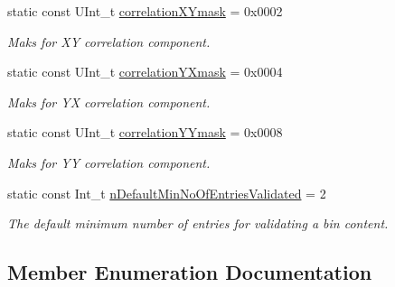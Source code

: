 \begin{DoxyCompactItemize}
\mbox{\label{classQn_1_1CorrectionHistogramBase_ae18a88f4419ad1ec1124e27b5527d685}} 
static const U\+Int\+\_\+t \mbox{\hyperlink{classQn_1_1CorrectionHistogramBase_ae18a88f4419ad1ec1124e27b5527d685}{correlation\+X\+Ymask}} = 0x0002
\begin{DoxyCompactList}\small\item\em Maks for XY correlation component. \end{DoxyCompactList}\item 
\mbox{\label{classQn_1_1CorrectionHistogramBase_ac248a0d6cc3d5fa4373962066ebaa74d}} 
static const U\+Int\+\_\+t \mbox{\hyperlink{classQn_1_1CorrectionHistogramBase_ac248a0d6cc3d5fa4373962066ebaa74d}{correlation\+Y\+Xmask}} = 0x0004
\begin{DoxyCompactList}\small\item\em Maks for YX correlation component. \end{DoxyCompactList}\item 
\mbox{\label{classQn_1_1CorrectionHistogramBase_a2169ee36c344c6e39388539b44fda4fc}} 
static const U\+Int\+\_\+t \mbox{\hyperlink{classQn_1_1CorrectionHistogramBase_a2169ee36c344c6e39388539b44fda4fc}{correlation\+Y\+Ymask}} = 0x0008
\begin{DoxyCompactList}\small\item\em Maks for YY correlation component. \end{DoxyCompactList}\item 
\mbox{\label{classQn_1_1CorrectionHistogramBase_a814879c162449360c1c1576ba19c76e8}} 
static const Int\+\_\+t \mbox{\hyperlink{classQn_1_1CorrectionHistogramBase_a814879c162449360c1c1576ba19c76e8}{n\+Default\+Min\+No\+Of\+Entries\+Validated}} = 2
\begin{DoxyCompactList}\small\item\em The default minimum number of entries for validating a bin content. \end{DoxyCompactList}\end{DoxyCompactItemize}


\subsection{Member Enumeration Documentation}
\mbox{\label{classQn_1_1CorrectionHistogramBase_ab32a60a9143c64f214ab3a2ed9263dfc}} 
